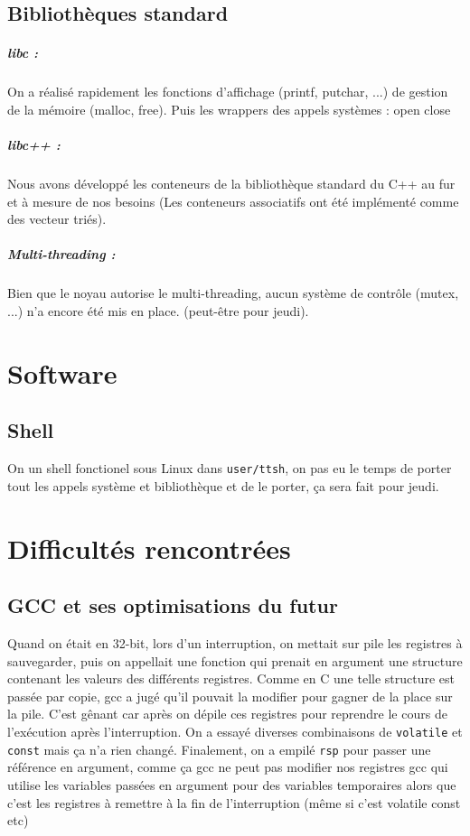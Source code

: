 \documentclass[12pt]{report}
\begin{document}
\section{Bibliothèques standard}

\paragraph{libc :} On a réalisé rapidement les fonctions d'affichage (printf,
putchar, ...) de gestion de la mémoire (malloc, free).
Puis les wrappers des appels systèmes : open close

\paragraph{libc++ :} Nous avons développé les conteneurs de la bibliothèque
standard du C++ au fur et à mesure de nos besoins (Les conteneurs associatifs
ont été implémenté comme des vecteur triés).

\paragraph{Multi-threading :} Bien que le noyau autorise le multi-threading,
aucun système de contrôle (mutex, ...) n'a encore été mis en place. (peut-être pour jeudi).

\chapter{Software}

\section{Shell} On un shell fonctionel sous Linux dans \verb$user/ttsh$, on pas
eu le temps de porter tout les appels système et bibliothèque et de le porter,
ça sera fait pour jeudi.

\chapter{Difficultés rencontrées}

\section*{GCC et ses optimisations du futur}

Quand on était en 32-bit, lors d'un interruption, on mettait sur pile les registres à sauvegarder, puis on appellait une fonction qui prenait en argument une structure contenant les valeurs des différents registres.
Comme en C une telle structure est passée par copie, gcc a jugé qu'il pouvait la modifier pour gagner de la place sur la pile.
C'est gênant car après on dépile ces registres pour reprendre le cours de l'exécution après l'interruption.
On a essayé diverses combinaisons de \verb$volatile$ et \verb$const$ mais ça n'a rien changé.
Finalement, on a empilé \verb$rsp$ pour passer une référence en argument, comme ça gcc ne peut pas modifier nos registres
gcc qui utilise les variables passées en argument pour des variables temporaires alors que c'est les registres à remettre à la fin de l'interruption (même si c'est volatile const etc)
\end{document}
